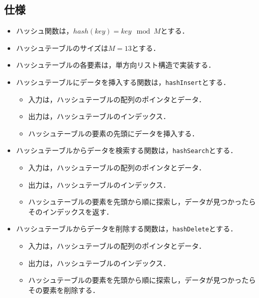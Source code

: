 \documentclass{ltjsarticle}
\begin{document}
\subsection{仕様}
\begin{itemize}
    \item ハッシュ関数は，$hash(key) = key \mod M$とする．
    \item ハッシュテーブルのサイズは$M = 13$とする．
    \item ハッシュテーブルの各要素は，単方向リスト構造で実装する．
    \item ハッシュテーブルにデータを挿入する関数は，\texttt{hashInsert}とする．
    \begin{itemize}
      \item 入力は，ハッシュテーブルの配列のポインタとデータ．
      \item 出力は，ハッシュテーブルのインデックス．
      \item ハッシュテーブルの要素の先頭にデータを挿入する．
    \end{itemize}
    \item ハッシュテーブルからデータを検索する関数は，\texttt{hashSearch}とする．
    \begin{itemize}
      \item 入力は，ハッシュテーブルの配列のポインタとデータ．
      \item 出力は，ハッシュテーブルのインデックス．
      \item ハッシュテーブルの要素を先頭から順に探索し，データが見つかったらそのインデックスを返す．
    \end{itemize}
    \item ハッシュテーブルからデータを削除する関数は，\texttt{hashDelete}とする．
    \begin{itemize}
      \item 入力は，ハッシュテーブルの配列のポインタとデータ．
      \item 出力は，ハッシュテーブルのインデックス．
      \item ハッシュテーブルの要素を先頭から順に探索し，データが見つかったらその要素を削除する．
    \end{itemize}
\end{itemize}
\end{document}

